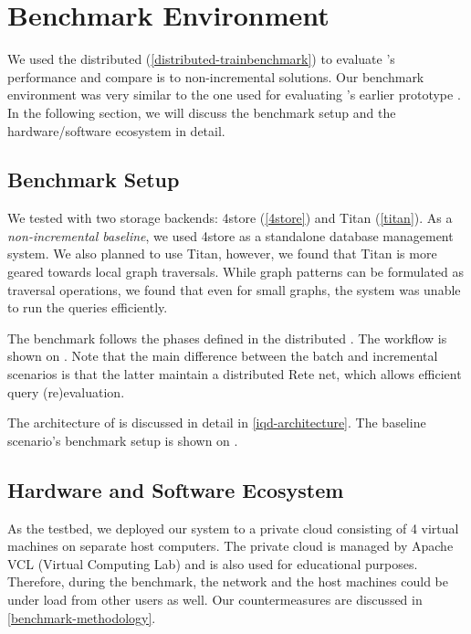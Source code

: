 \section{Benchmark Environment}
\label{sec:benchmark-environment}

We used the distributed \tb{} (\autoref{distributed-trainbenchmark}) to evaluate \iqd{}'s performance and compare is to non-incremental solutions. Our benchmark environment was very similar to the one used for evaluating \iqd{}'s earlier prototype \cite{Izso:2013:IIG:2487766.2487772}. In the following section, we will discuss the benchmark setup and the hardware/software ecosystem in detail.

\subsection{Benchmark Setup}

We tested \iqd{} with two storage backends: 4store (\autoref{4store}) and Titan (\autoref{titan}). As a \emph{non-incremental baseline}, we used 4store as a standalone database management system. We also planned to use Titan, however, we found that Titan is more geared towards local graph traversals. While graph patterns can be formulated as traversal operations, we found that even for small graphs, the system was unable to run the queries efficiently.


The benchmark follows the phases defined in the distributed \tb{}. The workflow is shown on . Note that the main difference between the batch and incremental scenarios is that the latter maintain a distributed Rete net, which allows efficient query (re)evaluation.   

The architecture of \iqd{} is discussed in detail in \autoref{iqd-architecture}. The baseline scenario's benchmark setup is shown on .


\subsection{Hardware and Software Ecosystem}
\label{ecosystem}

As the testbed, we deployed our system to a private cloud consisting of 4 virtual machines on separate host computers. The private cloud is managed by Apache VCL (Virtual Computing Lab) and is also used for educational purposes. Therefore, during the benchmark, the network and the host machines could be under load from other users as well. Our countermeasures are discussed in \autoref{benchmark-methodology}.

